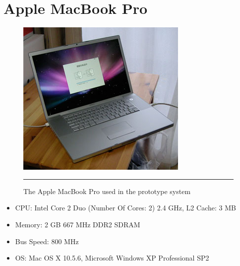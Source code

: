 \chapter{Apple MacBook Pro}
\label{AppendixB}

\begin{figure}[htbp]
  \centering
    \includegraphics{./Primitives/macbookpro.jpg}
    \rule{35em}{0.5pt}
  \caption[Apple MacBook Pro]{The Apple MacBook Pro used in the prototype system}
\end{figure}

\begin{itemize}
	\item CPU: Intel Core 2 Duo (Number Of Cores: 2) 2.4 GHz, L2 Cache: 3 MB
	\item Memory: 2 GB 667 MHz DDR2 SDRAM
	\item Bus Speed: 800 MHz
	\item OS: Mac OS X 10.5.6, Microsoft Windows XP Professional SP2
\end{itemize}
